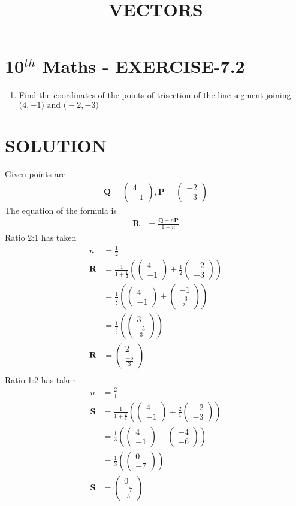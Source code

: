 \documentclass[12pt]{article}
\providecommand{\brak}[1]{\ensuremath{\left(#1\right)}}
\newcommand{\myvec}[1]{\ensuremath{\begin{pmatrix}#1\end{pmatrix}}}
\let\vec\mathbf
\begin{document}
\begin{center}
\title{\textbf{VECTORS}}
\date{\vspace{-5ex}} %
\maketitle
\end{center}

\section{10$^{th}$ Maths - EXERCISE-7.2}

\begin{enumerate}
\item Find the coordinates of the points of trisection of the line segment joining $\vec(4 ,-1) \text{ and } \vec(-2,-3)$ 
\end{enumerate}

\section{SOLUTION}
Given points are
\begin{align}
\vec{Q}=\myvec{4\\ -1} ,
\vec{P}=\myvec{-2\\ -3}
\end{align}
The equation of the formula is
\begin{align}
\vec{R}&=\frac{\vec{Q}+n\vec{P}}{1+n}
\end{align}
Ratio 2:1 has taken 
\begin{align}
n&=\frac{1}{2}\\
\vec{R}&=\frac{1}{1+\frac{1}{2}}\brak{\myvec{4\\-1}+\frac{1}{2}\myvec{-2\\-3}}\\
&=\frac{1}{\frac{3}{2}}\brak{\myvec{4\\ -1}+\myvec{-1\\ \frac{-3}{2}}}\\
&=\frac{1}{\frac{3}{2}}\brak {\myvec{3\\ \frac{-5}{3}}}\\
\vec{R}&=\myvec{2\\ \frac{-5}{3}}\\
\end{align}
Ratio 1:2 has taken
\begin{align}
n&=\frac{2}{1}\\
\vec{S}&=\frac{1}{1+\frac{2}{1}}\brak{\myvec{4\\-1}+\frac{2}{1}\myvec{-2\\-3}}\\
&=\frac{1}{3}\brak{\myvec{4\\ -1}+\myvec{-4\\-6}}\\
&=\frac{1}{3}\brak{\myvec{0\\ -7}}\\
\vec{S}&=\myvec{0\\ \frac{-7}{3}}
\end{align}
\end{document}
